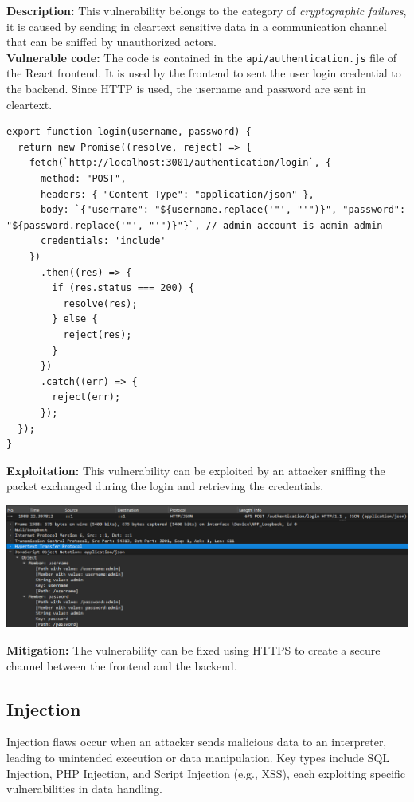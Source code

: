 \documentclass[]{article}
\begin{document}
\textbf{Description:} This vulnerability belongs to the category of {\it cryptographic failures}, it is caused by sending in cleartext sensitive data
in a communication channel that can be sniffed by unauthorized actors.
\\ 
\textbf{Vulnerable code:} The code is contained in the \texttt{api/authentication.js} file of the React frontend. It is used by the frontend to sent 
the user login credential to the backend. Since HTTP is used, the username and password are sent in cleartext.
\begin{lstlisting}
export function login(username, password) {
  return new Promise((resolve, reject) => {
    fetch(`http://localhost:3001/authentication/login`, {
      method: "POST",
      headers: { "Content-Type": "application/json" },
      body: `{"username": "${username.replace('"', "'")}", "password": "${password.replace('"', "'")}"}`, // admin account is admin admin
      credentials: 'include'
    })
      .then((res) => {
        if (res.status === 200) {
          resolve(res);
        } else {
          reject(res);
        }
      })
      .catch((err) => {
        reject(err);
      });
  });
}    
\end{lstlisting}
\textbf{Exploitation:} This vulnerability can be exploited by an attacker sniffing the packet exchanged during the login and retrieving the credentials.
\vspace{5pt}
\begin{center}
\includegraphics[width=\textwidth]{sensitive_data_exposure.eps}
\end{center}
\textbf{Mitigation:} The vulnerability can be fixed using HTTPS to create a secure channel between the frontend and the backend.

\subsection{Injection}

Injection flaws occur when an attacker sends malicious data to an interpreter, leading to unintended execution or data manipulation. Key types include SQL Injection, PHP Injection, and Script Injection (e.g., XSS), each exploiting specific vulnerabilities in data handling.
\end{document}
